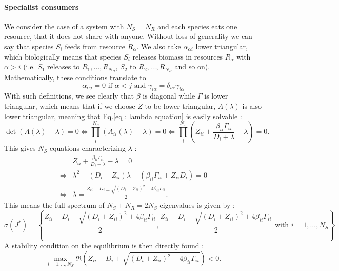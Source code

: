 \documentclass[12pt]{article}
\begin{document}
\begin{appendices}
		\paragraph{Specialist consumers} We consider the case of a system with $N_S = N_R$ and each species eats one resource, that it does not share with anyone. Without loss of generality we can say that species $S_i$ feeds from resource $R_\alpha$. We also take $\alpha_{\alpha i}$ lower triangular, which biologically means that species $S_i$ releases biomass in resources $R_\alpha$ with $\alpha > i$ (i.e. $S_1$ releases to $R_1, \dots, R_{N_R}$, $S_2$ to $R_2, \dots, R_{N_R}$ and so on). Mathematically, these conditions translate to
		\begin{equation}
			\alpha_{\alpha j} = 0 \text{ if } \alpha < j \text{ and } \gamma_{i\alpha} = \delta_{i\alpha} \gamma_{i\alpha}
		\end{equation}
		With such definitions, we see clearly that $\beta$ is diagonal while $\Gamma$ is lower triangular, which means that if we choose $Z$ to be lower triangular, $A(\lambda)$ is also lower triangular, meaning that Eq.\eqref{eq : lambda equation} is easily solvable : 
		\begin{equation}
		\det\left(A(\lambda)-\lambda\right) = 0 \iff \prod_i^{N_S} \left(A_{ii}(\lambda)-\lambda\right)=0 \iff \prod_i^{N_S}\left(Z_{ii}+\frac{\beta_{ii}\Gamma_{ii}}{D_i + \lambda}-\lambda\right)=0.
		\end{equation}
		This gives $N_S$ equations characterizing $\lambda$ :
		\begin{align}
			& Z_{ii}+\frac{\beta_{ii}\Gamma_{ii}}{D_i + \lambda}-\lambda = 0 \\
			\iff & \lambda^2 + \left(D_i-Z_{ii}\right) \lambda-\left(\beta_{ii}\Gamma_{ii}+Z_{ii}D_i\right) = 0 \\
			\iff & \lambda = \frac{Z_{ii}-D_i \pm \sqrt{\left(D_i+Z_{ii}\right)^2 + 4 \beta_{ii} \Gamma_{ii}}}{2}.
		\end{align}
		This means the full spectrum of $N_S + N_R = 2 N_S$ eigenvalues is given by :
		\begin{equation}
			\sigma(J^*) = \left\{\frac{Z_{ii}-D_i + \sqrt{\left(D_i+Z_{ii}\right)^2 + 4 \beta_{ii} \Gamma_{ii}}}{2}, \frac{Z_{ii}-D_i - \sqrt{\left(D_i+Z_{ii}\right)^2 + 4 \beta_{ii} \Gamma_{ii}}}{2} \text{ with } i = 1, \dots, N_S\right\}
		\end{equation}
		A stability condition on the equilibrium is then directly found : 
		\begin{equation}
			\max_{i = 1, \dots, N_S}\Re\left(Z_{ii}-D_i + \sqrt{\left(D_i+Z_{ii}\right)^2 + 4 \beta_{ii} \Gamma_{ii}}\right) < 0. \label{eq : stability condition}

\end{equation}
\end{appendices}
\end{document}
